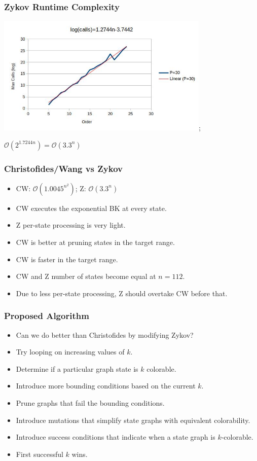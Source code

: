 \documentclass{beamer}
\newcommand{\BO}{\mathcal{O}}
\begin{document}
\begin{frame}
  \frametitle{Zykov Runtime Complexity}
  \begin{center}
    \includegraphics[width=4in]{../final/zykov_runtime};

    \bigskip

    \(\BO(2^{1.7244n})=\BO(3.3^n)\)
  \end{center}
\end{frame}

\begin{frame}
  \frametitle{Christofides/Wang vs Zykov}
  \begin{itemize}
  \item CW: \(\BO(1.0045^{n^2})\); Z: \(\BO(3.3^n)\)
  \item CW executes the exponential BK at every state.
  \item Z per-state processing is very light.
  \item CW is better at pruning states in the target range.
  \item CW is faster in the target range.
  \item CW and Z number of states become equal at \(n=112\).
  \item Due to less per-state processing, Z should overtake CW before that.
  \end{itemize}
\end{frame}

\begin{frame}
  \frametitle{Proposed Algorithm}
  \begin{itemize}
  \item Can we do better than Christofides by modifying Zykov?
  \item Try looping on increasing values of \(k\).
  \item Determine if a particular graph state is \(k\) colorable.
  \item Introduce more bounding conditions based on the current \(k\).
  \item Prune graphs that fail the bounding conditions.
  \item Introduce mutations that simplify state graphs with equivalent colorability.
  \item Introduce success conditions that indicate when a state graph is \(k\)-colorable.
  \item First successful \(k\) wins.
  \end{itemize}
\end{frame}
\end{document}

